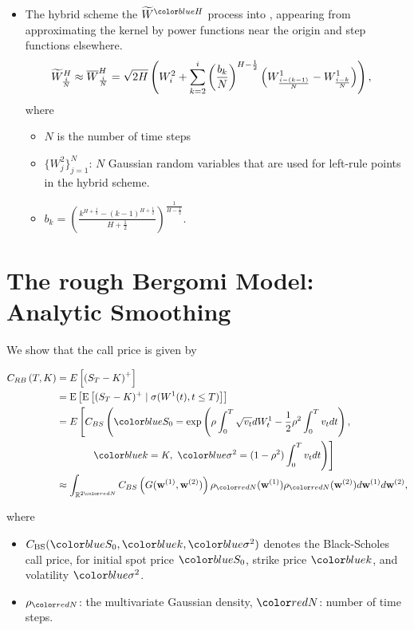 \documentclass[ima, 20pt, portrait, plainboxedsections]{sciposter}
\begin{document}
\begin{multicols}{3}
\begin{itemize}
\item 	The hybrid scheme  the  $\widetilde{W}^\blue{H}$ process into , appearing from approximating the kernel by power functions near the origin and step functions elsewhere.
\begin{align*}
\widetilde{W}^H_{\frac{i}{N}} \approx \overline{W}^H_{\frac{i}{N}}&= \sqrt{2H} \left(  W^2_i+\sum_{k=2}^{i} \left(\frac{b_k}{N}\right)^{H-\frac{1}{2}} \left(W_{\frac{i-(k-1)}{N}}^1-W_{\frac{i-k}{N}}^1\right)\right),
\end{align*}
where \begin{itemize}
\item $N$ is the number of time steps 
\item $\{W^{2}_j\}_{j=1}^N$:  $N$ Gaussian random variables that are used for left-rule points in the hybrid scheme.
\item $b_k=\left(\frac{k^{H+\frac{1}{2}}-(k-1)^{H+\frac{1}{2} }}{H+\frac{1}{2}}\right)^{\frac{1}{H-\frac{1}{2}}}.$
\end{itemize}
\end{itemize}
\section*{The rough Bergomi Model: Analytic Smoothing}
We show that the call price is given by
%
\begin{small}
\begin{align}
C_{RB}\left( T, K \right) &= E\left[ \left(S_T - K \right)^+ \right]  \nonumber\\
&=\expt{\expt{(S_T-K)^+ \mid \sigma(W^1(t) ,t \le T)}}\nonumber \\
&=E\left[C_{BS}\left( \blue{S_0} = \operatorname{exp}\left(\rho \int_0^T \sqrt{v_t} dW_t^1 - \frac{1}{2}
\rho^2 \int_0^T v_t dt\right), \right. \right.\nonumber\\
&\quad \quad \quad \left.\left.\ \blue{k} = K , \ \blue{\sigma^2} = (1-\rho^2)
\int_0^T v_t dt \right) \right]\nonumber\\
&\approx \int_{\rset^{2\red{N}}} C_{BS} \left(G(\mathbf{w}^{(1)},\mathbf{w}^{(2)})\right) \rho_{\red{N}}(\mathbf{w}^{(1)})  \rho_{\red{N}}(\mathbf{w}^{(2)}) d\mathbf{w}^{(1)} d\mathbf{w}^{(2)} \COMMA
\end{align}
\end{small}
where 
\begin{itemize}
\item $C_{\text{BS}}(\blue{S_0},\blue{k},\blue{\sigma^2})$ denotes the Black-Scholes call price, for initial spot price $\blue{S_0}$, strike price $\blue{k}$, and volatility $\blue{\sigma^2}$.
\item $\rho_{\red{N}}$: the multivariate Gaussian density, $\red{N}$: number of time steps.
\end{itemize} 

\end{multicols}
\end{document}
